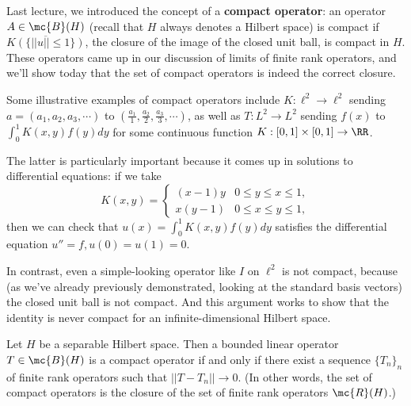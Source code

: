 Last lecture, we introduced the concept of a \textbf{compact operator}: an operator $A \in \mc{B}(H)$ (recall that $H$ always denotes a Hilbert space) is compact if $\overline{K(\{||u|| \le 1\})}$, the closure of the image of the closed unit ball, is compact in $H$. These operators came up in our discussion of limits of finite rank operators, and we'll show today that the set of compact operators is indeed the correct closure. 

\begin{example}
Some illustrative examples of compact operators include $K: \ell^2 \to \ell^2$ sending $a = (a_1, a_2, a_3, \cdots)$ to $(\frac{a_1}{1}, \frac{a_2}{2}, \frac{a_3}{3}, \cdots)$, as well as $T: L^2 \to L^2$ sending $f(x)$ to $\int_0^1 K(x, y) f(y) dy$ for some continuous function $K: [0, 1] \times [0, 1] \to \RR$.
\end{example}

The latter is particularly important because it comes up in solutions to differential equations: if we take 
\[
    K(x, y) = \begin{cases} (x-1) y & 0 \le y \le x \le 1, \\ x(y-1) & 0 \le x \le y \le 1, \end{cases} 
\] 
then we can check that $u(x) = \int_0^1 K(x, y) f(y) dy$ satisfies the differential equation $u'' = f, u(0) = u(1) = 0$. 

\begin{example}
In contrast, even a simple-looking operator like $I$ on $\ell^2$ is not compact, because (as we've already previously demonstrated, looking at the standard basis vectors) the closed unit ball is not compact. And this argument works to show that the identity is never compact for an infinite-dimensional Hilbert space.
\end{example}

\begin{theorem}
Let $H$ be a separable Hilbert space. Then a bounded linear operator $T \in \mc{B}(H)$ is a compact operator if and only if there exist a sequence $\{T_n\}_n$ of finite rank operators such that $||T - T_n|| \to 0$. (In other words, the set of compact operators is the closure of the set of finite rank operators $\mc{R}(H)$.)
\end{theorem}

